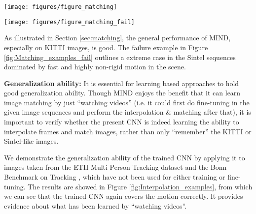 \documentclass[runningheads]{llncs}
\begin{document}
	\begin{figure*}[t]
		\centering
		\texttt{[image: figures/figure\_matching]}
		\caption{Two matching examples for image pairs taken from the KITTI RAW video and the Sintel movie clip (best viewed in colour). For each example, the corresponding row of images shows input image 1, the interpolated image, and then input image 2 (from left to right). The red points mark five sample correspondences. The two rows below each example show the gradient/saliency maps for each match (from left to right) in each input image (maps for input image 1 on top, and maps for input image 2 in the bottom). The figures also indicate the coordinates of the maximal gradient location (P) along with the corresponding matching score (S). The matching score is defined as the ratio between the maximum gradient intensity and the mean gradient intensity within a 20$\times$20 area around P.}
		\label{fig:Matching_examples}
	\end{figure*}	
	
	\begin{figure*}[!t]
		\centering
		\texttt{[image: figures/figure\_matching\_fail]}
		\caption{Failure example of MIND for image pair taken from the Sintel movie clip (best viewed in colour). The gradient/saliency maps (from left to right) are for matches labelled as 1, 2, \dots, 5,  respectively. }
		\label{fig:Matching_examples_fail}
	\end{figure*}
		
	As illustrated in Section \ref{sec:matching}, the general performance of MIND, especially on KITTI images, is good. The failure example in Figure \ref{fig:Matching_examples_fail} outlines a extreme case in the Sintel sequences dominated by fast and highly non-rigid motion in the scene.


	
	\vspace{+0.1cm}
	\noindent\textbf{Generalization ability:} It is essential for learning based approaches to hold good generalization ability. Though MIND enjoys the benefit that it can learn image matching by just ``watching videos'' (i.e. it could first do fine-tuning in the given image sequences and perform the interpolation \& matching after that), it is important to verify whether the present CNN is indeed learning the ability to interpolate frames and match images, rather than only ``remember'' the KITTI or Sintel-like images. 
	
	We demonstrate the generalization ability of the trained CNN by applying it to images taken from the ETH Multi-Person Tracking dataset \cite{ess2009robust} and the Bonn Benchmark on Tracking \cite{KleinIROS10}, which have not been used for either training or fine-tuning. The results are showed in Figure \ref{fig:Interpolation_examples}, from which we can see that the trained CNN again covers the motion correctly. It provides evidence about what has been learned by ``watching videos''.
	
\end{document}
